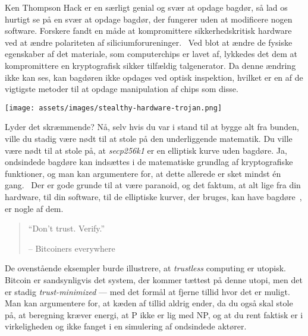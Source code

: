 Ken Thompson Hack er en særligt genial og svær at opdage bagdør,
så lad os hurtigt se på en svær at opdage bagdør, der fungerer uden at
modificere nogen software. Forskere fandt en måde at kompromittere 
sikkerhedskritisk hardware ved at ændre polariteten af 
siliciumforureninger.~\cite{becker2013stealthy} Ved blot at ændre de fysiske 
egenskaber af det materiale, som computerchips er lavet af, lykkedes det dem 
at kompromittere en kryptografisk sikker tilfældig talgenerator. Da denne
ændring ikke kan ses, kan bagdøren ikke opdages ved optisk inspektion, 
hvilket er en af de vigtigste metoder til at opdage manipulation af chips 
som disse.

\begin{center}
  \texttt{[image: assets/images/stealthy-hardware-trojan.png]}
  \label{fig:stealthy-hardware-trojan}
\end{center}

Lyder det skræmmende? Nå, selv hvis du var i stand til at bygge alt fra
bunden, ville du stadig være nødt til at stole på den underliggende matematik. 
Du ville være nødt til at stole på, at \textit{secp256k1} er en elliptisk kurve 
uden bagdøre. Ja, ondsindede bagdøre kan indsættes i de matematiske
grundlag af kryptografiske funktioner, og man kan argumentere for, at dette 
allerede er sket mindst én gang.~\cite{wiki:Dual_EC_DRBG} Der er gode grunde 
til at være paranoid, og det faktum, at alt lige fra din hardware, til din 
software, til de elliptiske kurver, der bruges, kan have 
bagdøre~\cite{wiki:backdoors}, er nogle af dem.

\begin{quotation}\begin{samepage}
  \enquote{Don't trust. Verify.}
  \begin{flushright} -- Bitcoiners everywhere
\end{flushright}\end{samepage}\end{quotation}

De ovenstående eksempler burde illustrere, at \textit{trustless} computing er
utopisk. Bitcoin er sandsynligvis det system, der kommer tættest på denne
utopi, men det er stadig \textit{trust-minimized} --- med det formål at fjerne 
tillid hvor det er muligt. Man kan argumentere for, at kæden af tillid aldrig 
ender, da du også skal stole på, at beregning kræver energi, at P ikke er 
lig med NP, og at du rent faktisk er i virkeligheden og ikke
fanget i en simulering af ondsindede aktører.

